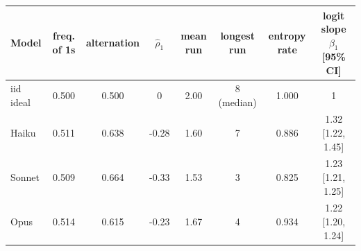 \begin{tabular}{lccccccc}
\toprule
Model & freq. of 1s & alternation & $\hat\rho_1$ & mean run & longest run & entropy rate & logit slope $\beta_1$ [95\% CI] \\
\midrule
iid ideal & 0.500 & 0.500 & 0 & 2.00 & 8 (median) & 1.000 & 1 \\
Haiku & 0.511 & 0.638 & -0.28 & 1.60 & 7 & 0.886 & 1.32 [1.22, 1.45] \\
Sonnet & 0.509 & 0.664 & -0.33 & 1.53 & 3 & 0.825 & 1.23 [1.21, 1.25] \\
Opus & 0.514 & 0.615 & -0.23 & 1.67 & 4 & 0.934 & 1.22 [1.20, 1.24] \\
\bottomrule
\end{tabular}
